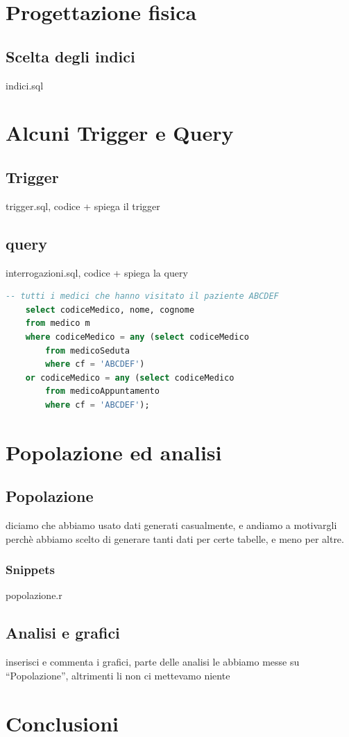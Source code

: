 \documentclass[11pt]{article}
\begin{document}
\section{Progettazione fisica}
\subsection{Scelta degli indici}
indici.sql


\section{Alcuni Trigger e Query}
\subsection{Trigger}
\label{trig:trigger1}
trigger.sql, codice + spiega il trigger
\subsection{query}
interrogazioni.sql, codice + spiega la query
\begin{lstlisting}[language=SQL]
    -- tutti i medici che hanno visitato il paziente ABCDEF
    select codiceMedico, nome, cognome
    from medico m
    where codiceMedico = any (select codiceMedico
        from medicoSeduta
        where cf = 'ABCDEF')
    or codiceMedico = any (select codiceMedico
        from medicoAppuntamento
        where cf = 'ABCDEF');
\end{lstlisting}


\section{Popolazione ed analisi}
\subsection{Popolazione}
\label{pop:popolazione}
diciamo che abbiamo usato dati generati casualmente, e andiamo a motivargli perchè abbiamo scelto di generare 
tanti dati per certe tabelle, e meno per altre.
\subsubsection{Snippets}
popolazione.r
\subsection{Analisi e grafici}
inserisci e commenta i grafici, parte delle analisi le abbiamo messe su ``Popolazione'', altrimenti li non ci mettevamo niente

\section{Conclusioni}
\end{document}
